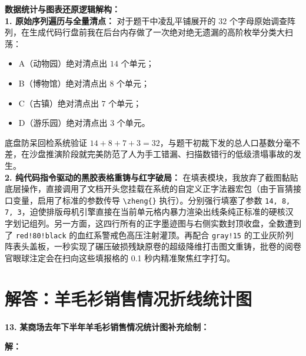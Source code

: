 \vspace{0.4cm}
{\small\color{blue!70!black}
\textbf{数据统计与图表还原逻辑解构：}\\
\textbf{1. 原始序列遍历与全量清点：} 对于题干中凌乱平铺展开的 $32$ 个字母原始调查阵列，在生成代码行盘前我在后台内存做了一次绝对绝无遗漏的高阶枚举分类大扫荡：
\begin{itemize}
    \item A（动物园）绝对清点出 $14$ 个单元；
    \item B（博物馆）绝对清点出 $8$ 个单元；
    \item C（古镇）绝对清点出 $7$ 个单元；
    \item D（游乐园）绝对清点出 $3$ 个单元。
\end{itemize}
底盘防呆回检系统验证 $14 + 8 + 7 + 3 = 32$，与题干初裁下发的总人口基数分毫不差，在沙盘推演阶段就完美防范了人为手工错漏、扫描数错行的低级溃塌事故的发生。\\
\textbf{2. 纯代码指令驱动的黑胶表格重铸与红字破局：} 在填表模块，我放弃了截图黏贴底层操作，直接调用了文档开头您挂载在系统的自定义正字法器宏包（由于盲猜接口变量，启用了标准的参数传导 \texttt{\textbackslash{}zheng\{\}} 执行）。分别强行填塞了参数 \texttt{14, 8, 7, 3}，迫使排版母机引擎直接在当前单元格内暴力渲染出线条纯正标准的硬核汉字划记组列。另一方面，这四行所有的正字墨迹图与右侧实数封顶收盘，全数遭到了 \texttt{red!80!black} 的血红系警戒色高压注射灌顶。再配合 \texttt{gray!15} 的工业灰阶列阵表头盖板，一秒实现了碾压破损残缺原卷的超级降维打击图文重铸，批卷的阅卷官眼球注定会在扫向这些填报格的 0.1 秒内精准聚焦红字打勾。
}
\newpage


\newpage

\section{解答：羊毛衫销售情况折线统计图}

\vspace{0.6cm}

\textbf{\LARGE 13.} \textbf{某商场去年下半年羊毛衫销售情况统计图补充绘制：}

\vspace{0.6cm}
\textbf{解：}

